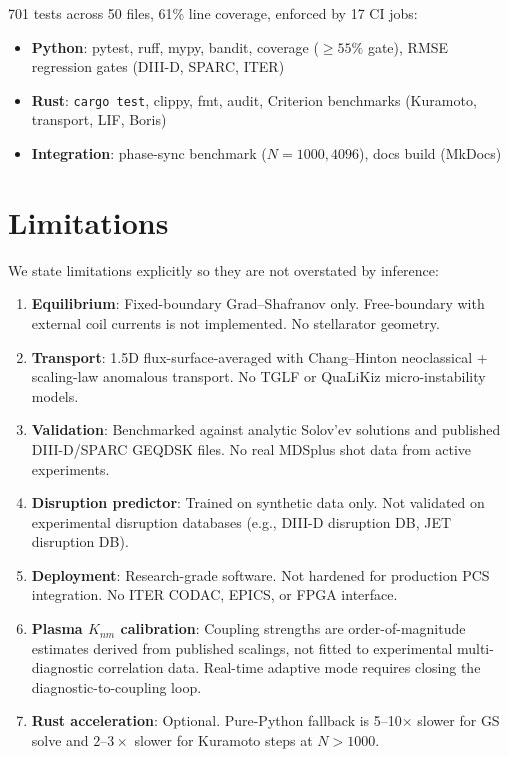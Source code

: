 \documentclass[twocolumn,preprintnumbers,amsmath,amssymb,prl,floatfix]{revtex4-2}
\begin{document}
701 tests across 50 files, 61\% line coverage, enforced by
17 CI jobs:
\begin{itemize}
  \item \textbf{Python}: pytest, ruff, mypy, bandit, coverage
        ($\geq 55\%$ gate), RMSE regression gates
        (DIII-D, SPARC, ITER)
  \item \textbf{Rust}: \texttt{cargo test}, clippy, fmt, audit,
        Criterion benchmarks (Kuramoto, transport, LIF, Boris)
  \item \textbf{Integration}: phase-sync benchmark
        ($N = 1000, 4096$), docs build (MkDocs)
\end{itemize}


\section{Limitations}
\label{sec:limitations}

We state limitations explicitly so they are not overstated
by inference:

\begin{enumerate}
  \item \textbf{Equilibrium}: Fixed-boundary Grad--Shafranov only.
    Free-boundary with external coil currents is not implemented.
    No stellarator geometry.
  \item \textbf{Transport}: 1.5D flux-surface-averaged with
    Chang--Hinton neoclassical + scaling-law anomalous transport.
    No TGLF or QuaLiKiz micro-instability models.
  \item \textbf{Validation}: Benchmarked against analytic
    Solov'ev solutions and published DIII-D/SPARC GEQDSK files.
    No real MDSplus shot data from active experiments.
  \item \textbf{Disruption predictor}: Trained on synthetic data
    only.  Not validated on experimental disruption databases
    (e.g., DIII-D disruption DB, JET disruption DB).
  \item \textbf{Deployment}: Research-grade software.
    Not hardened for production PCS integration.
    No ITER CODAC, EPICS, or FPGA interface.
  \item \textbf{Plasma $K_{nm}$ calibration}: Coupling strengths
    are order-of-magnitude estimates derived from published
    scalings, not fitted to experimental multi-diagnostic
    correlation data.  Real-time adaptive mode requires
    closing the diagnostic-to-coupling loop.
  \item \textbf{Rust acceleration}: Optional.
    Pure-Python fallback is 5--10$\times$ slower for GS solve
    and $2$--$3\times$ slower for Kuramoto steps at $N > 1000$.
\end{enumerate}
\end{document}
